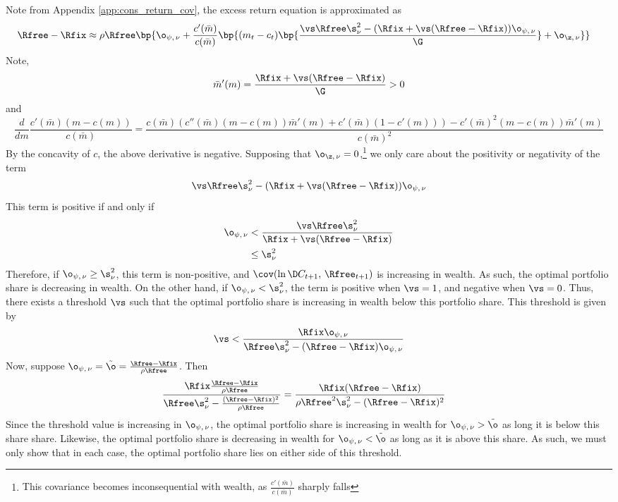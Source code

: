 

Note from Appendix \ref{app:cons_return_cov}, the excess return equation is approximated as
\begin{align*}
    \Rfree - \Rfix &\approx \rho\Rfree\bp{\o_{\psi,\,\nu} + \frac{c'(\bar{m})}{c(\bar{m})}\bp{(m_t - c_t)\bp{\frac{\vs\Rfree\s_{\nu}^2 - (\Rfix + \vs(\Rfree - \Rfix))\o_{\psi,\,\nu}}{\G}} + \o_{\z,\,\nu}}}
\end{align*}
Note,
\[
\bar{m}'(m) = \frac{\Rfix + \vs(\Rfree - \Rfix)}{\G} > 0
\]
and
\[
\frac{d}{dm}\frac{c'(\bar{m})(m - c(m))}{c(\bar{m})} = \frac{c(\bar{m})(c''(\bar{m})(m - c(m))\bar{m}'(m) + c'(\bar{m})(1 - c'(m))) - c'(\bar{m})^2(m - c(m))\bar{m}'(m)}{c(\bar{m})^2}
\]
By the concavity of $c$, the above derivative is negative. Supposing that $\o_{\z,\,\nu} = 0$,\footnote{This covariance becomes inconsequential with wealth, as $\frac{c'(\bar{m})}{c(\bar{m})}$ sharply falls} we only care about the positivity or negativity of the term
\[
    \vs\Rfree\s_{\nu}^2 - (\Rfix + \vs(\Rfree - \Rfix))\o_{\psi,\,\nu}
\]
This term is positive if and only if
\begin{align*}
    \o_{\psi,\,\nu} &< \frac{\vs\Rfree\s_{\nu}^2}{\Rfix + \vs(\Rfree - \Rfix)}\\
    &\leq \s_{\nu}^2
\end{align*}
Therefore, if $\o_{\psi,\,\nu} \geq \s_{\nu}^2$, this term is non-positive, and $\cov(\ln \D C_{t+1},\,\Rfree_{t+1})$ is increasing in wealth. As such, the optimal portfolio share is decreasing in wealth. On the other hand, if $\o_{\psi,\,\nu} < \s_{\nu}^2$, the term is positive when $\vs = 1$, and negative when $\vs = 0$. Thus, there exists a threshold $\vs$ such that the optimal portfolio share is increasing in wealth below this portfolio share. This threshold is given by
\[
\vs < \frac{\Rfix\o_{\psi,\,\nu}}{\Rfree\s_{\nu}^2 - (\Rfree - \Rfix)\o_{\psi,\,\nu}}
\]
Now, suppose $\o_{\psi,\,\nu} = \tilde{\o} = \frac{\Rfree - \Rfix}{\rho\Rfree}$. Then
\begin{align*}
    \frac{\Rfix\frac{\Rfree - \Rfix}{\rho\Rfree}}{\Rfree\s_{\nu}^2 - \frac{(\Rfree - \Rfix)^2}{\rho\Rfree}} &= \frac{\Rfix(\Rfree - \Rfix)}{\rho\Rfree^2\s_{\nu}^2 - (\Rfree - \Rfix)^2}
\end{align*}
Since the threshold value is increasing in $\o_{\psi,\,\nu}$, the optimal portfolio share is increasing in wealth for $\o_{\psi,\,\nu} > \tilde{\o}$ as long it is below this share share. Likewise, the optimal portfolio share is decreasing in wealth for $\o_{\psi,\,\nu} < \tilde{\o}$ as long as it is above this share. As such, we must only show that in each case, the optimal portfolio share lies on either side of this threshold.


